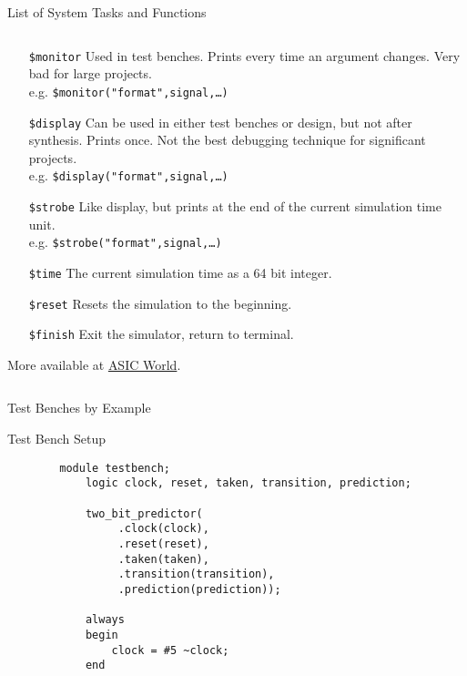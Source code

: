 \documentclass[table,dvipsnames,colorlinks=true]{beamer}
\begin{document}
\begin{frame}{List of System Tasks and Functions}
    \begin{columns}
        \begin{column}{0.85\textwidth}
            \begin{itemize}
                \item[\texttt{\$monitor}] Used in test benches. Prints every
                    time an argument changes. Very bad for large projects. \\
                    e.g. \texttt{\$monitor("format",signal,\dots)}
                \item[\texttt{\$display}] Can be used in either test benches or
                    design, but not after synthesis. Prints once. Not the best
                    debugging technique for significant projects. \\
                    e.g. \texttt{\$display("format",signal,\dots)}
                \item[\texttt{\$strobe}] Like display, but prints at the end of
                    the current simulation time unit. \\
                    e.g. \texttt{\$strobe("format",signal,\dots)}
                \item[\texttt{\$time}] The current simulation time as a 64 bit
                    integer.
                \item[\texttt{\$reset}] Resets the simulation to the beginning.
                \item[\texttt{\$finish}] Exit the simulator, return to terminal.
            \end{itemize}

            More available at
            \href{http://www.asic-world.com/verilog/sys_task_func1.html}{ASIC
            World}.
        \end{column}
    \end{columns}
\end{frame}

\begin{frame}[fragile]{Test Benches by Example}
    \begin{block}{Test Bench Setup}
    \begin{verbatim}
        module testbench;
            logic clock, reset, taken, transition, prediction;
            
            two_bit_predictor(
                 .clock(clock),
                 .reset(reset),
                 .taken(taken),
                 .transition(transition),
                 .prediction(prediction));
        
            always
            begin
                clock = #5 ~clock;
            end
    \end{verbatim}
    \end{block}
\end{frame}
\end{document}
